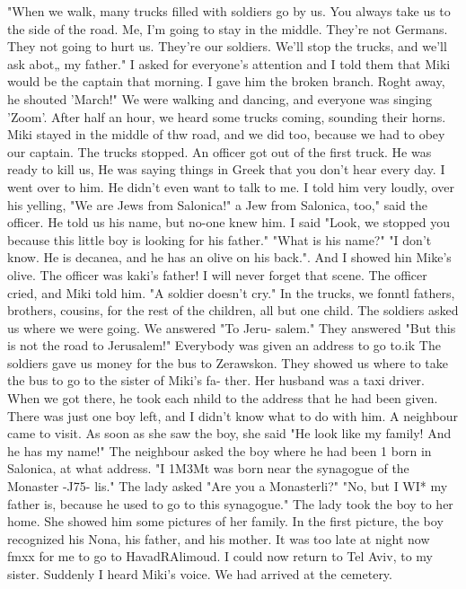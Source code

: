 "When we walk, many trucks filled with soldiers go by us.
You always take us to 
the side of the road.
Me, I'm going to stay in the middle.
They're not Germans.
They 
not going to hurt us.
They're our soldiers.
We'll stop the trucks, and we'll ask abot„ 
my father."
I asked for everyone's attention and I told them that Miki would be the captain 
that morning.
I gave him the broken branch.
Roght away, he shouted 'March!"
We were walking and dancing, and everyone was singing 'Zoom'.
After half an hour, 
we heard some trucks coming, sounding their horns.
Miki stayed in the middle of thw 
road, and we did too, because we had to obey our captain.
The trucks stopped.
An 
officer got out of the first truck.
He was ready to kill us, He was saying things in 
Greek that you don't hear every day.
I went over to him.
He didn't even want to talk 
to me.
I told him very loudly, over his yelling, "We are Jews from Salonica!"
a Jew from Salonica, too," said the officer.
He told us his name, but no-one knew him.
I said "Look, we stopped you because this little boy is looking for his father."
"What is his name?"
"I don't know.
He is decanea, and he has an olive on his back.".
And I showed hin 
Mike's olive.
The officer was kaki's father!
I will never forget that scene.
The 
officer cried, and Miki told him.
"A soldier doesn't cry."
In the trucks, we fonntl fathers, brothers, cousins, for the rest of the children, 
all but one child.
The soldiers asked us where we were going.
We answered "To Jeru-
salem."
They answered "But this is not the road to Jerusalem!"
Everybody was given an address to go to.ik The soldiers gave us money for the bus 
to Zerawskon.
They showed us where to take the bus to go to the sister of Miki's fa-
ther.
Her husband was a taxi driver.
When we got there, he took each nhild to the 
address that he had been given.
There was just one boy left, and I didn't know what to 
do with him.
A neighbour came to visit.
As soon as she saw the boy, she said "He look 
like my family!
And he has my name!"
The neighbour asked the boy where he had been 1 
born in Salonica, at what address.
"I 1M3Mt was born near the synagogue of the Monaster 
-J75- 
lis."
The lady asked "Are you a Monasterli?"
"No, but I WI* my father is, because 
he used to go to this synagogue."
The lady took the boy to her home.
She showed him some pictures of her family.
In 
the first picture, the boy recognized his Nona, his father, and his mother.
It was too 
late at night now fmxx for me to go to HavadRAlimoud.
I could now return to Tel Aviv, 
to my sister.
Suddenly I heard Miki's voice.
We had arrived at the cemetery.
